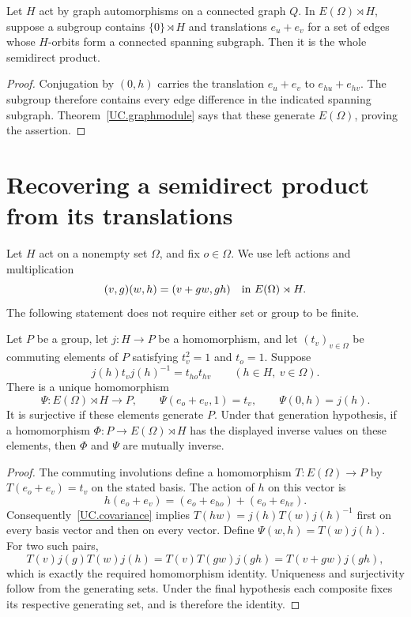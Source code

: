 \begin{corollary}\label{UC.edgegeneration}
Let $H$ act by graph automorphisms on a connected graph $Q$. In
$E(\Omega)\rtimes H$, suppose a subgroup contains $\{0\}\rtimes H$
and translations $e_u+e_v$ for a set of edges whose $H$-orbits form a
connected spanning subgraph. Then it is the whole semidirect product.
\end{corollary}
\begin{proof}
Conjugation by $(0,h)$ carries the translation $e_u+e_v$ to
$e_{hu}+e_{hv}$. The subgroup therefore contains every edge difference
in the indicated spanning subgraph. Theorem~\ref{UC.graphmodule} says
that these generate $E(\Omega)$, proving the assertion.
\end{proof}

\section{Recovering a semidirect product from its translations}
Let $H$ act on a nonempty set $\Omega$, and fix $o\in\Omega$.
We use left actions and multiplication
\[
 (v,g)(w,h)=(v+gw,gh)
       \quad\hbox{in }E(\Omega)\rtimes H.
\]
The following statement does not require either set or group to be
finite.

\begin{theorem}\label{UC.recognition}
Let $P$ be a group, let $j:H\to P$ be a homomorphism, and let
$(t_v)_{v\in\Omega}$ be commuting elements of $P$ satisfying
$t_v^2=1$ and $t_o=1$. Suppose
\begin{equation}\label{UC.covariance}
 j(h)t_vj(h)^{-1}=t_{ho}t_{hv}
        \qquad(h\in H,\ v\in\Omega).
\end{equation}
There is a unique homomorphism
\[
 \Psi:E(\Omega)\rtimes H\longrightarrow P,
 \qquad \Psi(e_o+e_v,1)=t_v,
 \qquad \Psi(0,h)=j(h).
\]
It is surjective if these elements generate $P$. Under that generation
hypothesis, if a homomorphism $\Phi:P\to E(\Omega)\rtimes H$ has
the displayed inverse values on these elements, then $\Phi$ and
$\Psi$ are mutually inverse.
\end{theorem}
\begin{proof}
The commuting involutions define a homomorphism
$T:E(\Omega)\to P$ by $T(e_o+e_v)=t_v$ on the stated basis.
The action of $h$ on this vector is
\[
 h(e_o+e_v)=(e_o+e_{ho})+(e_o+e_{hv}).
\]
Consequently~\eqref{UC.covariance} implies
$T(hw)=j(h)T(w)j(h)^{-1}$ first on every basis vector and then on
every vector. Define $\Psi(w,h)=T(w)j(h)$. For two such pairs,
\[
 T(v)j(g)T(w)j(h)=T(v)T(gw)j(gh)=T(v+gw)j(gh),
\]
which is exactly the required homomorphism identity. Uniqueness and
surjectivity follow from the generating sets. Under the final
hypothesis each composite fixes its respective generating set, and is
therefore the identity.
\end{proof}

